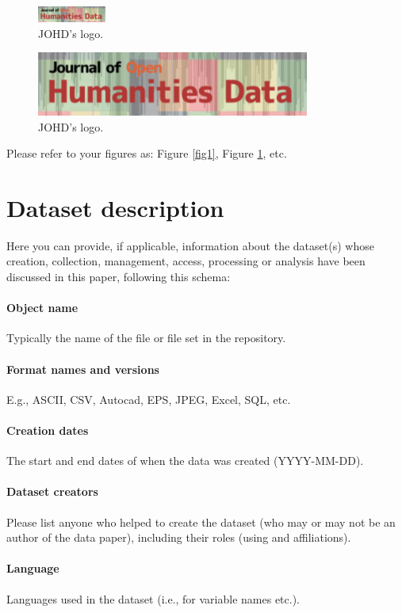 \documentclass[11pt]{article}
\begin{document}
\begin{figure}[H]
\centering
\includegraphics[width=0.2\textwidth]{images/image.jpg}
\caption{\label{fig2}JOHD's logo.}
\end{figure}

\begin{figure}[H]
\centering
\includegraphics[width=0.8\textwidth]{images/image.jpg}
\caption{\label{fig3}JOHD's logo.}
\end{figure}

\noindent Please refer to your figures as: Figure \ref{fig1}, Figure \ref{fig2}, etc.


\section{Dataset description}
Here you can provide, if applicable, information about the dataset(s) whose creation, collection, management, access, processing or analysis have been discussed in this paper, following this schema:
\paragraph{Object name} Typically the name of the file or file set in the repository.
\paragraph{Format names and versions} E.g., ASCII, CSV, Autocad, EPS, JPEG, Excel, SQL, etc.
\paragraph{Creation dates} The start and end dates of when the data was created (YYYY-MM-DD).
\paragraph{Dataset creators} Please list anyone who helped to create the dataset (who may or may not be an author of the data paper), including their roles (using and affiliations).
\paragraph{Language} Languages used in the dataset (i.e., for variable names etc.).
\end{document}
